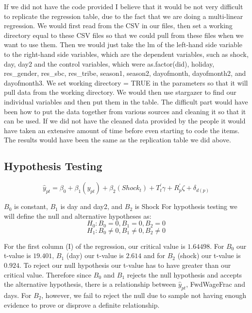 \documentclass{article}
\begin{document}
\newline
\newline
If we did not have the code provided I believe that it would be not very difficult to replicate the regression table, due to the fact that we are doing a multi-linear regression. We would first read from the CSV in our files, then set a working directory equal to these CSV files so that we could pull from these files when we want to use them. Then we would just take the lm of the left-hand side variable to the right-hand side variables, which are the dependent variables, such as shock, day, day2 and the control variables, which were as.factor(did), holiday, res\_gender, res\_sbc, res\_tribe, season1, season2, dayofmonth, dayofmonth2, and dayofmonth3. We set working directory = TRUE in the parameters so that it will pull data from the working directory. We would then use stargazer to find our individual variables and then put them in the table. The difficult part would have been how to put the data together from various sources and cleaning it so that it can be used. If we did not have the cleaned data provided by the people it would have taken an extensive amount of time before even starting to code the items. The results would have been the same as the replication table we did above. 

\subsection{Hypothesis Testing}
$$\hat{y}_{pt}= \beta_0 + \beta_1(y_{pt}) + \beta_2(Shock_t) + T^{'}_t\gamma + R^{'}_p\zeta + \delta_{d(p)}  $$

$B_0$ is constant, $B_1$ is day and day2, and $B_2$ is Shock
\newline
\newline
For hypothesis testing we will define the null and alternative hypotheses as:
\newline
$$H_0: B_0 = 0,  B_1 = 0, B_2 = 0$$
$$H_1: B_0 \neq 0, B_1 \neq 0, B_2 \neq 0$$

For the first column (I) of the regression, our critical value is $1.64498$. For $B_0$ our t-value is $19.401$, $B_1$ (day) our t-value is $2.614$ and for $B_2$ (shock) our t-value is $0.924$. To reject our null hypothesis our t-value has to have greater than our critical value. Therefore since $B_0$ and $B_1$ rejects the null hypothesis and accepts the alternative hypothesis, there is a relationship between $\hat{y}_{pt}$, FwdWageFrac and days. For  $B_2$, however, we fail to reject the null due to sample not having enough evidence to prove or disprove a definite relationship. 
\end{document}
